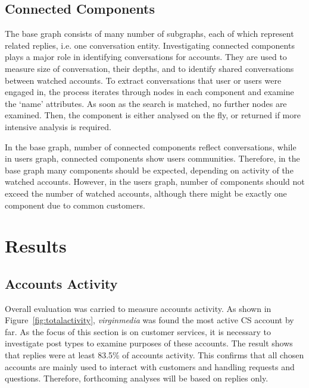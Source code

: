 \documentclass[sigconf]{acmart}
\begin{document}
\subsection{Connected Components}

The base graph consists of many number of subgraphs, each of which
represent related replies, i.e. one conversation entity. Investigating
connected components plays a major role in identifying conversations
for accounts. They are used to measure size of conversation, their
depths, and to identify shared conversations between watched
accounts. To extract conversations that user or users were engaged in,
the process iterates through nodes in each component and examine the
`name' attributes. As soon as the search is matched, no further nodes
are examined. Then, the component is either analysed on the fly, or
returned if more intensive analysis is required.

In the base graph, number of connected components reflect
conversations, while in users graph, connected components show users
communities. Therefore, in the base graph many components should be
expected, depending on activity of the watched accounts. However, in
the users graph, number of components should not exceed the number of
watched accounts, although there might be exactly one component due to
common customers.


\section{Results}\label{results}

\subsection{Accounts Activity}

Overall evaluation was carried to measure accounts activity. As shown in
Figure~\ref{fig:totalactivity}, {\emph{virginmedia}} was found the most 
active CS account by far. As the focus of this section is on customer services, 
it is necessary to investigate post types to examine purposes of
these accounts. The result shows that replies were at least 83.5\% of
accounts activity. This confirms that all chosen accounts are mainly
used to interact with customers and handling requests and
questions. Therefore, forthcoming analyses will be based on replies
only. 
\end{document}
